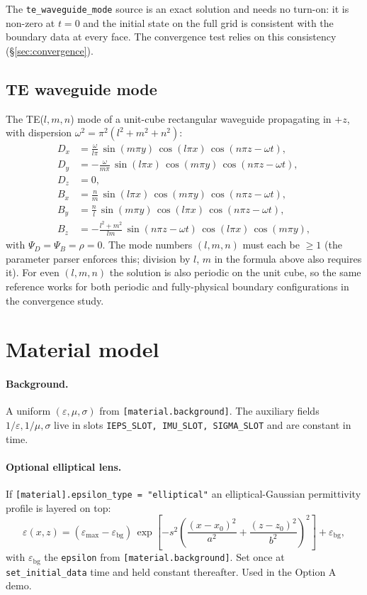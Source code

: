 \documentclass[11pt]{article}
\newcommand{\eps}{\varepsilon}
\begin{document}
The \texttt{te\_waveguide\_mode} source is an exact solution and
needs no turn-on: it is non-zero at $t = 0$ and the initial state
on the full grid is consistent with the boundary data at every
face.  The convergence test relies on this consistency
(\S\ref{sec:convergence}).

\subsection{TE waveguide mode}
\label{sec:te-mode}

The TE($l, m, n$) mode of a unit-cube rectangular waveguide
propagating in $+z$, with dispersion
$\omega^2 = \pi^2(l^2 + m^2 + n^2)$:
\begin{align*}
  D_x &= \frac{\omega}{l\pi}\, \sin(m\pi y)\, \cos(l\pi x)\, \cos(n\pi z - \omega t), \\
  D_y &= -\frac{\omega}{m\pi}\, \sin(l\pi x)\, \cos(m\pi y)\, \cos(n\pi z - \omega t), \\
  D_z &= 0, \\
  B_x &= \frac{n}{m}\, \sin(l\pi x)\, \cos(m\pi y)\, \cos(n\pi z - \omega t), \\
  B_y &= \frac{n}{l}\, \sin(m\pi y)\, \cos(l\pi x)\, \cos(n\pi z - \omega t), \\
  B_z &= -\frac{l^2+m^2}{lm}\, \sin(n\pi z - \omega t)\, \cos(l\pi x)\, \cos(m\pi y),
\end{align*}
with $\Psi_D = \Psi_B = \rho = 0$.  The mode numbers
$(l, m, n)$ must each be $\geq 1$ (the parameter parser enforces
this; division by $l$, $m$ in the formula above also requires it).
For even $(l, m, n)$ the solution is also periodic on the unit
cube, so the same reference works for both periodic and
fully-physical boundary configurations in the convergence study.

\section{Material model}
\label{sec:material}

\paragraph{Background.}
A uniform $(\eps, \mu, \sigma)$ from
\texttt{[material.background]}.  The auxiliary fields
$1/\eps, 1/\mu, \sigma$ live in slots
\texttt{IEPS\_SLOT, IMU\_SLOT, SIGMA\_SLOT} and are constant in
time.

\paragraph{Optional elliptical lens.}
If \texttt{[material].epsilon\_type = "elliptical"} an
elliptical-Gaussian permittivity profile is layered on top:
\begin{equation}
  \eps(x, z) = (\eps_{\max} - \eps_{\text{bg}})\,
    \exp\!\left[-s^2 \left(\frac{(x-x_0)^2}{a^2}
                          + \frac{(z-z_0)^2}{b^2}\right)^2\right]
    + \eps_{\text{bg}},
  \label{eq:lens}
\end{equation}
with $\eps_{\text{bg}}$ the \texttt{epsilon} from
\texttt{[material.background]}.  Set once at
\texttt{set\_initial\_data} time and held constant thereafter.
Used in the Option A demo.
\end{document}
